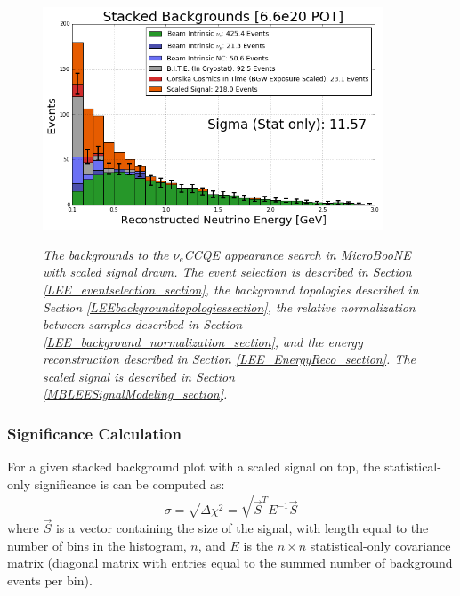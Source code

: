 \begin{figure}[ht!]
\centering
\includegraphics[width=0.9\textwidth]{Figures/LEE_perfectreco_fullstack_WithAnalysisCuts.png}\\
\caption{\textit{The backgrounds to the $\nu_e$CCQE appearance search in MicroBooNE with scaled signal drawn. The event selection is described in Section \ref{LEE_eventselection_section}, the background topologies described in Section \ref{LEEbackgroundtopologiessection}, the relative normalization between samples described in Section \ref{LEE_background_normalization_section}, and the energy reconstruction described in Section \ref{LEE_EnergyReco_section}. The scaled signal is described in Section \ref{MBLEESignalModeling_section}.}}
\label{LEE_perfectreco_fullstack_fig}
\end{figure}

\subsubsection{Significance Calculation}
For a given stacked background plot with a scaled signal on top, the statistical-only significance is can be computed as:
\begin{equation}\label{chisquaresigeqtn}
\sigma = \sqrt{\Delta \chi^2} = \sqrt{\vec{S}^TE^{-1}\vec{S}}
\end{equation}
where $\vec{S}$ is a vector containing the size of the signal, with length equal to the number of bins in the histogram, $n$, and $E$ is the $n\times n$ statistical-only covariance matrix (diagonal matrix with entries equal to the summed number of background events per bin).


